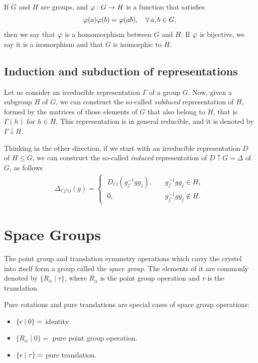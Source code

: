 \documentclass[a4paper,12pt]{report}
\newcommand{\sg}[2]{\{ #1 \mid #2 \}}
\begin{document}
If $G$ and $H$ are groups, and $\varphi: G \to H$ is a function that satisfies
$$
\varphi(a)\varphi(b) = \varphi(ab), \quad \forall \, a,b \in G,
$$
then we say that $\varphi$ is a homomorphism between $G$ and $H$. If $\varphi$ is bijective, we say it is a isomorphism and that $G$ is isomorphic to $H$.

\subsection{Induction and subduction of representations}

Let us consider an irreducible representation $\Gamma$ of a group $G$. Now, given a subgroup $H$ of $G$, we can construct the so-called \textit{subduced} representation of $H$, formed by the matrices of those elements of $G$ that also belong to $H$, that is $\Gamma(h)$ for $h \in H$. This representation is in general reducible, and it is denoted by $\Gamma \downarrow H$.

Thinking in the other direction, if we start with an irreducible representation $D$ of $H \leq G$, we can construct the so-called \textit{induced} representation of $D \uparrow G = \Delta$ of $G$, as follows
\begin{align*}
\Delta_{i'j'ij}(g) =
\begin{cases}
\; D_{i'i}(g_{j'}^{-1} g g_j), \quad & g_{j'}^{-1} g g_j \in H, \\
\; 0,  & g_{j'}^{-1} g g_j \notin H.
\end{cases}
\end{align*}

\section{Space Groups}

The point group and translation symmetry operations which carry the crystel into itself form a group called the \textit{space group}. The elements of it are commonly denoted by  $\{ R_\alpha \mid \tau \} $, where $R_\alpha$ is the point group operation and $\tau$ is the translation.

Pure rotations and pure translations are special cases of space group operations:
\begin{itemize}
\item $\sg{\eps}{0} =$ identity.
\item $\sg{R_\alpha}{0} =$ pure point group operation.
\item $\sg{\eps}{\tau} =$ pure translation.
\end{itemize}
\end{document}
